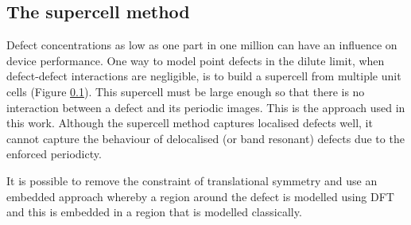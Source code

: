 

\subsection{The supercell method}

Defect concentrations as low as one part in one million can have an influence on device performance. 
One way to model point defects in the dilute limit, when defect-defect interactions are negligible, is to build a supercell from multiple unit cells (Figure \ref{}).
This supercell must be large enough so that there is no interaction between a defect and its periodic images.
This is the approach used in this work.
Although the supercell method captures localised defects well, it cannot capture the behaviour of delocalised (or band resonant) defects due to the enforced periodicty. 


It is possible to remove the constraint of translational symmetry and use an embedded approach whereby a region around the defect is modelled using DFT and this is embedded in a region that is modelled classically.



